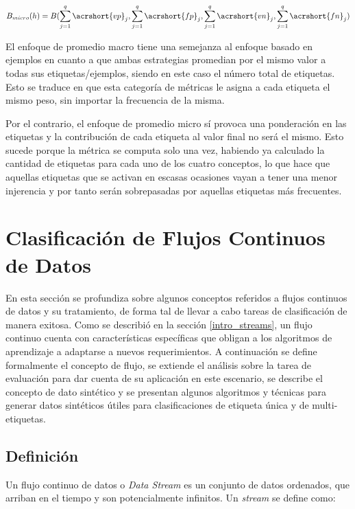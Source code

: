 \begin{equation}
   B_{micro}(h) = B( \sum_{j=1}^{q} \acrshort{vp}_{j}, \sum_{j=1}^{q}
   \acrshort{fp}_{j},\sum_{j=1}^{q}  \acrshort{vn}_{j},\sum_{j=1}^{q}
   \acrshort{fn}_{j})
\end{equation}

El enfoque de promedio macro tiene una semejanza al enfoque basado en ejemplos
en cuanto a que ambas estrategias promedian por el mismo valor a todas sus
etiquetas/ejemplos, siendo en este caso el número total de etiquetas. Esto se
traduce en que esta categoría de métricas le asigna a cada etiqueta el mismo
peso, sin importar la frecuencia de la misma. 

Por el contrario, el enfoque de promedio micro sí provoca una ponderación en las
etiquetas y la contribución de cada etiqueta al valor final no será el mismo.
Esto sucede porque la métrica se computa solo una vez, habiendo ya calculado la
cantidad de etiquetas para cada uno de los cuatro conceptos, lo que hace que
aquellas etiquetas que se activan en escasas ocasiones vayan a tener una menor
injerencia y por tanto serán sobrepasadas por aquellas etiquetas más frecuentes.

\section{Clasificación de Flujos Continuos de Datos}

En esta sección se profundiza sobre algunos conceptos referidos a flujos
continuos de datos y su tratamiento, de forma tal de llevar a cabo tareas de
clasificación de manera exitosa.  Como se describió en la sección
\ref{intro_streams}, un flujo continuo cuenta con características específicas
que obligan a los algoritmos de aprendizaje a adaptarse a nuevos requerimientos.
A continuación se define formalmente el concepto de flujo, se extiende el
análisis sobre la tarea de evaluación para dar cuenta de su aplicación en este
escenario, se describe el concepto de dato sintético y se presentan algunos
algoritmos y técnicas para generar datos sintéticos útiles para clasificaciones
de etiqueta única y de multi-etiquetas.  

\subsection{Definición}

Un flujo continuo de datos o \textit{Data Stream} es un conjunto de datos
ordenados, que arriban en el tiempo y son potencialmente infinitos. Un
\textit{stream} se define como:

